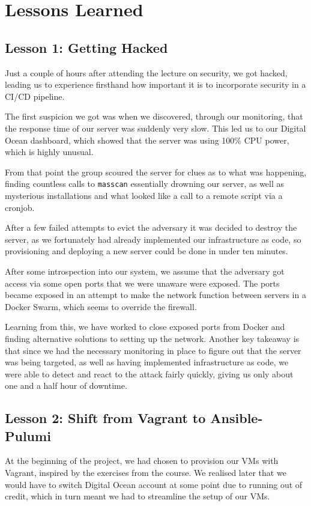 \section{Lessons Learned}

\subsection{Lesson 1: Getting Hacked}
\label{section_hacked}
Just a couple of hours after attending the lecture on security, we got hacked, leading us to experience firsthand how important it is to incorporate security in a CI/CD pipeline.

The first suspicion we got was when we discovered, through our monitoring, that the response time of our server was suddenly very slow. This led us to our Digital Ocean dashboard, which showed that the server was using 100\% CPU power, which is highly unusual.

From that point the group scoured the server for clues as to what was happening, finding countless calls to \texttt{masscan} essentially drowning our server, as well as mysterious installations and what looked like a call to a remote script via a cronjob.

After a few failed attempts to evict the adversary it was decided to destroy the server, as we fortunately had already implemented our infrastructure as code, so provisioning and deploying a new server could be done in under ten minutes.

After some introspection into our system, we assume that the adversary got access via some open ports that we were unaware were exposed. The ports became exposed in an attempt to make the network function between servers in a Docker Swarm, which seems to override the firewall.

Learning from this, we have worked to close exposed ports from Docker and finding alternative solutions to setting up the network. Another key takeaway is that since we had the necessary monitoring in place to figure out that the server was being targeted, as well as having implemented infrastructure as code, we were able to detect and react to the attack fairly quickly, giving us only about one and a half hour of downtime.

\subsection{Lesson 2: Shift from Vagrant to Ansible-Pulumi}
At the beginning of the project, we had chosen to provision our VMs with Vagrant, inspired by the exercises from the course.
We realised later that we would have to switch Digital Ocean account at some point due to running out of credit, which in turn meant we had to streamline the setup of our VMs.

